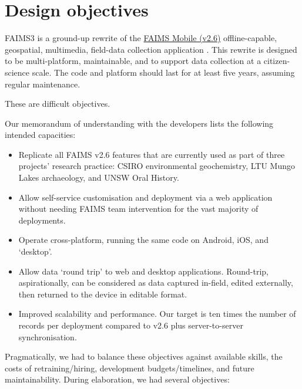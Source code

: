 \documentclass{faims3_report}
\begin{document}
\chapter{Design objectives}

FAIMS3 is a ground-up rewrite of the
\href{https://github.com/FAIMS}{{FAIMS Mobile (v2.6)}} offline-capable,
geospatial, multimedia, field-data collection application
\autocite{Ballsun-Stanton2018-hq}. This rewrite is designed to be multi-platform, maintainable, and
to support data collection at a citizen-science scale. The code and
platform should last for at least five years, assuming regular
maintenance.

These are difficult objectives.

Our memorandum of understanding with the developers lists the following
intended capacities:

\begin{itemize}
\item Replicate all FAIMS v2.6 features that are currently used as part of
  three projects' research practice: CSIRO environmental geochemistry,
  LTU Mungo Lakes archaeology, and UNSW Oral History.
 
\item Allow self-service customisation and deployment via a web application
  without needing FAIMS team intervention for the vast majority of
  deployments.
 
\item Operate cross-platform, running the same code on Android, iOS, and
  `desktop'.
 
\item Allow data `round trip' to web and desktop applications. Round-trip,
  aspirationally, can be considered as data captured in-field, edited
  externally, then returned to the device in editable format.
 
\item Improved scalability and performance. Our target is ten times the
  number of records per deployment compared to v2.6 plus
  server-to-server synchronisation.
 
\end{itemize}

Pragmatically, we had to balance these objectives against available
skills, the costs of retraining/hiring, development budgets/timelines,
and future maintainability. During elaboration, we had several
objectives:
\end{document}
